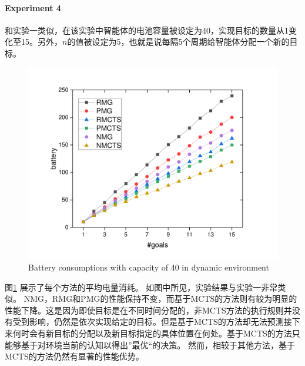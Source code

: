 \paragraph{Experiment 4}
和实验一类似，在该实验中智能体的电池容量被设定为40，实现目标的数量从1变化至15。另外，$n$的值被设定为5，也就是说每隔5个周期给智能体分配一个新的目标。
\begin{figure}[h!]
\centering
\includegraphics[scale=0.4]{./figs/gX_cY_fixCap40_d}
\captionsetup{justification=centering}
\caption{Battery consumptions with capacity of 40 in dynamic environment}
\label{fig:dynamic1}
\end{figure}

图\ref{fig:dynamic1} 展示了每个方法的平均电量消耗。
%
如图中所见，实验结果与实验一非常类似。
%
NMG，RMG和PMG的性能保持不变，而基于MCTS的方法则有较为明显的性能下降。这是因为即使目标是在不同时间分配的，非MCTS方法的执行规则并没有受到影响，仍然是依次实现给定的目标。但是基于MCTS的方法却无法预测接下来何时会有新目标的分配以及新目标指定的具体位置在何处。基于MCTS的方法只能够基于对环境当前的认知以得出”最优“的决策。
%
然而，相较于其他方法，基于MCTS的方法仍然有显著的性能优势。

